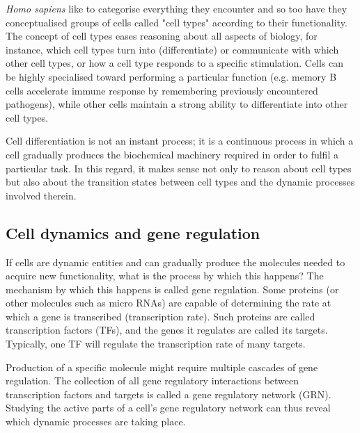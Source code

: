 \textit{Homo sapiens} like to categorise everything they encounter and so too have they conceptualised groups of cells called "cell types" according to their functionality. The concept of cell types eases reasoning about all aspects of biology, for instance, which cell types turn into (differentiate) or communicate with which other cell types, or how a cell type responds to a specific stimulation. Cells can be highly specialised toward performing a particular function (e.g. memory B cells accelerate immune response by remembering previously encountered pathogens), while other cells maintain a strong ability to differentiate into other cell types. 

Cell differentiation is not an instant process; it is a continuous process in which a cell gradually produces the biochemical machinery required in order to fulfil a particular task. In this regard, it makes sense not only to reason about cell types but also about the transition states between cell types and the dynamic processes involved therein.

\subsection{Cell dynamics and gene regulation}
If cells are dynamic entities and can gradually produce the molecules needed to acquire new functionality, what is the process by which this happens? The mechanism by which this happens is called gene regulation. Some proteins (or other molecules such as micro RNAs) are capable of determining the rate at which a gene is transcribed (transcription rate). Such proteins are called transcription factors (TFs), and the genes it regulates are called its targets. Typically, one TF will regulate the transcription rate of many targets. %

Production of a specific molecule might require multiple cascades of gene regulation. The collection of all gene regulatory interactions between transcription factors and targets is called a gene regulatory network (GRN). Studying the active parts of a cell's gene regulatory network can thus reveal which dynamic processes are taking place. 

